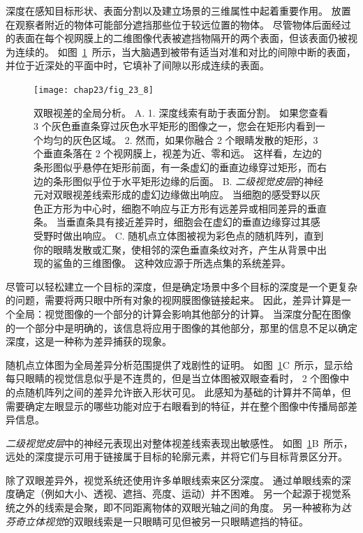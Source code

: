 深度在感知目标形状、表面分割以及建立场景的三维属性中起着重要作用。
放置在观察者附近的物体可能部分遮挡那些位于较远位置的物体。
尽管物体后面经过的表面在每个视网膜上的二维图像代表被遮挡物隔开的两个表面，但该表面仍被视为连续的。
如图~\ref{fig:23_8}~所示，当大脑遇到被带有适当对准和对比的间隙中断的表面，并位于近深处的平面中时，它填补了间隙以形成连续的表面。


\begin{figure}[htbp]
	\centering
	\texttt{[image: chap23/fig\_23\_8]}
	\caption{双眼视差的全局分析。
		A. 1. 深度线索有助于表面分割。
		如果您查看 3 个灰色垂直条穿过灰色水平矩形的图像之一，您会在矩形内看到一个均匀的灰色区域。
		2. 然而，如果你融合 2 个眼睛发散的矩形，3 个垂直条落在 2 个视网膜上，视差为近、零和远。
		这样看，左边的条形图似乎悬停在矩形前面，有一条虚幻的垂直边缘穿过矩形，而右边的条形图似乎位于水平矩形边缘的后面。
		B. \textit{二级视觉皮层}的神经元对双眼视差线索形成的虚幻边缘做出响应。
		当细胞的感受野以灰色正方形为中心时，细胞不响应与正方形有远差异或相同差异的垂直条。
		当垂直条具有接近差异时，细胞会在虚幻的垂直边缘穿过其感受野时做出响应\cite{bakin2000visual}。
		C. 随机点立体图被视为彩色点的随机阵列，直到你的眼睛发散或汇聚，使相邻的深色垂直条纹对齐，产生从背景中出现的鲨鱼的三维图像。
		这种效应源于所选点集的系统差异。}
	\label{fig:23_8}
\end{figure}


尽管可以轻松建立一个目标的深度，但是确定场景中多个目标的深度是一个更复杂的问题，需要将两只眼中所有对象的视网膜图像链接起来。
因此，差异计算是一个全局：视觉图像的一个部分的计算会影响其他部分的计算。
当深度分配在图像的一个部分中是明确的，该信息将应用于图像的其他部分，那里的信息不足以确定深度，这是一种称为差异捕获的现象。


随机点立体图为全局差异分析范围提供了戏剧性的证明。
如图~\ref{fig:23_8}C~所示，显示给每只眼睛的视觉信息似乎是不连贯的，但是当立体图被双眼查看时， 2 个图像中的点随机阵列之间的差异允许嵌入形状可见。
此感知为基础的计算并不简单，但需要确定左眼显示的哪些功能对应于右眼看到的特征，并在整个图像中传播局部差异信息。


\textit{二级视觉皮层}中的神经元表现出对整体视差线索表现出敏感性。
如图~\ref{fig:23_8}B~所示，远处的深度提示可用于链接属于目标的轮廓元素，并将它们与目标背景区分开。


除了双眼差异外，视觉系统还使用许多单眼线索来区分深度。
通过单眼线索的深度确定（例如大小、透视、遮挡、亮度、运动）并不困难。
另一个起源于视觉系统之外的线索是会聚，即不同距离物体的双眼光轴之间的角度。
另一种被称为\textit{达芬奇立体视觉}的双眼线索是一只眼睛可见但被另一只眼睛遮挡的特征。


